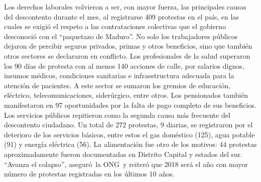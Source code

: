 \documentclass{article}%
\begin{document}
\newline%
%
Los derechos laborales volvieron a ser, con mayor fuerza, las principales causas del descontento durante el mes, al registrarse 409 protestas en el país, en las cuales se exigió el respeto a las contrataciones colectivas que el gobierno desconoció con el “paquetazo de Maduro”. No solo los trabajadores públicos dejaron de percibir seguros privados, primas y otros beneficios, sino que también otros sectores se declararon en conflicto. Los profesionales de la salud superaron los 90 días de protesta con al menos 140 acciones de calle, por salarios dignos, insumos médicos, condiciones sanitarias e infraestructura adecuada para la atención de pacientes. A este sector se sumaron los gremios de educación, eléctrico, telecomunicaciones, siderúrgico, entre otros. Los pensionados también manifestaron en 97 oportunidades por la falta de pago completo de sus beneficios.%
\newline%
%
Los servicios públicos repitieron como la segunda causa más frecuente del descontento ciudadano. Un total de 272 protestas, 9 diarias, se registraron por el deterioro de los servicios básicos, entre estos el gas doméstico (125), agua potable (91) y energía eléctrica (56). La alimentación fue otro de los motivos: 44 protestas aproximadamente fueron documentadas en Distrito Capital y estados del sur. “Avanza el colapso”, aseguró~la ONG~y reiteró que 2018 será el año con mayor número de protestas registradas en los últimos 10 años.%
\newline%
%
\end{document}
